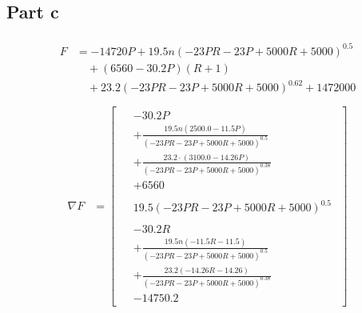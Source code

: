 \documentclass[a4paper,12pt]{article} %
\begin{document}
\subsection{Part c}
\begin{align*}
  \begin{split} 
F &= - 14720 P + 19.5 n {\left(- 23 P R - 23 P + 5000 R + 5000\right)}^{0.5}\\
  & \quad + \left(6560 - 30.2 P\right) \left(R + 1\right)\\
  & \quad  + 23.2 {\left(- 23 P R - 23 P + 5000 R + 5000\right)}^{0.62} + 1472000\\
  \end{split} 
\end{align*}
\begin{align*}
  \nabla F &= \left[
    \begin{matrix}
    \begin{aligned}
    &- 30.2 P \\
    &+ \frac{19.5 n (2500.0 - 11.5 P)}{(- 23 P R - 23 P + 5000 R + 5000)^{0.5}} \\
    &+ \frac{23.2 \cdot (3100.0 - 14.26 P)}{(- 23 P R - 23 P + 5000 R + 5000)^{0.38}} \\
    &+ 6560
    \end{aligned}
    \\
    \begin{aligned}
    &19.5 (- 23 P R - 23 P + 5000 R + 5000)^{0.5}
    \end{aligned}
    \\
    \begin{aligned}
    &- 30.2 R \\
    &+ \frac{19.5 n (- 11.5 R - 11.5)}{(- 23 P R - 23 P + 5000 R + 5000)^{0.5}} \\
    &+ \frac{23.2 (- 14.26 R - 14.26)}{(- 23 P R - 23 P + 5000 R + 5000)^{0.38}} \\
    &- 14750.2
    \end{aligned}
    \end{matrix}
    \right]\\

\end{align*}
\end{document}
